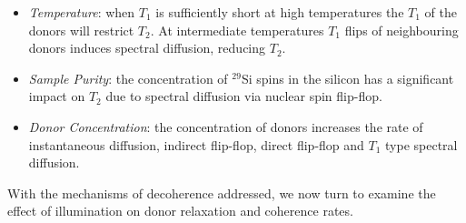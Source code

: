 \begin{itemize}
\item \textit{Temperature}: when $T_1$ is sufficiently short at high temperatures the $T_1$ of the donors will restrict $T_2$. At intermediate temperatures $T_1$ flips of neighbouring donors induces spectral diffusion, reducing $T_2$.
\item \textit{Sample Purity}: the concentration of $^{29}$Si spins in the silicon has a significant impact on $T_2$ due to spectral diffusion via nuclear spin flip-flop.
\item \textit{Donor Concentration}: the concentration of donors increases the rate of instantaneous diffusion, indirect flip-flop, direct flip-flop and $T_1$ type spectral diffusion. 
\end{itemize}

With the mechanisms of decoherence addressed, we now turn to examine the effect of illumination on donor relaxation and coherence rates.

